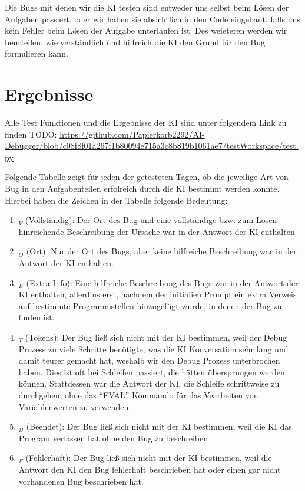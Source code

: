 \documentclass[a4paper,12pt,ngerman]{scrartcl}
\newcommand{\cmark}{\ding{51}}%
\newcommand{\xmark}{\ding{55}}%
\begin{document}
Die Bugs mit denen wir die KI testen sind entweder uns selbst beim Lösen der Aufgaben passiert, oder wir haben sie absichtlich in den Code eingebaut, falls uns kein Fehler beim Lösen der Aufgabe unterlaufen ist. Des weieteren werden wir beurteilen, wie verständlich und hilfreich die KI den Grund für den Bug formulieren kann.

\section{Ergebnisse}

Alle Test Funktionen und die Ergebnisse der KI sind unter folgendem Link zu finden TODO: \url{https://github.com/Papierkorb2292/AI-Debugger/blob/c08f8f01a267f1b80094e715a3c8b819b1061ae7/testWorkspace/test.py}

Folgende Tabelle zeigt für jeden der getesteten Tagen, ob die jeweilige Art von Bug in den Aufgabenteilen erfolreich durch die KI bestimmt werden konnte. Hierbei haben die Zeichen in der Tabelle folgende Bedeutung:
\begin{enumerate}
\item \cmark$_V$ (Vollständig): Der Ort des Bug und eine vollständige bzw. zum Lösen hinreichende Beschreibung der Ursache war in der Antwort der KI enthalten
\item \cmark$_O$ (Ort): Nur der Ort des Bugs, aber keine hilfreiche Beschreibung war in der Antwort der KI enthalten.
\item \cmark$_E$ (Extra Info): Eine hilfreiche Beschreibung des Bugs war in der Antwort der KI enthalten, allerdins erst, nachdem der initialien Prompt ein extra Verweis auf bestimmte Programmstellen hinzugefügt wurde, in denen der Bug zu finden ist.
\item \xmark$_T$ (Tokens): Der Bug ließ sich nicht mit der KI bestimmen, weil der Debug Prozess zu viele Schritte benötigte, was die KI Konversation sehr lang und damit teurer gemacht hat, weshalb wir den Debug Prozess unterbrochen haben. Dies ist oft bei Schleifen passiert, die hätten übersprungen werden können. Stattdessen war die Antwort der KI, die Schleife schrittweise zu durchgehen, ohne das ``EVAL'' Kommando für das Vearbeiten von Variablenwerten zu verwenden.
\item \xmark$_B$ (Beendet):   Der Bug ließ sich nicht mit der KI bestimmen, weil die KI das Program verlassen hat ohne den Bug zu beschreiben
\item \xmark$_F$ (Fehlerhaft): Der Bug ließ sich nicht mit der KI bestimmen, weil die Antwort den KI den Bug fehlerhaft beschrieben hat oder einen gar nicht vorhandenen Bug beschrieben hat.
\end{enumerate}
\end{document}
